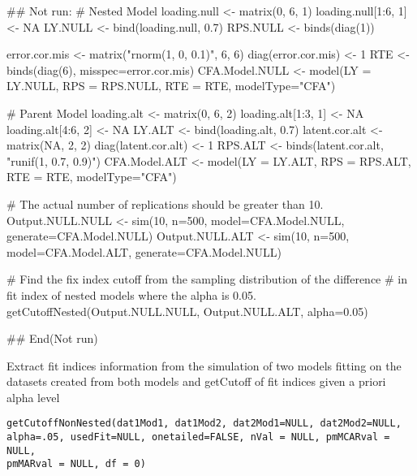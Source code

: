 \documentclass[a4paper]{book}
\begin{document}
\begin{Examples}
\begin{ExampleCode}
## Not run: 
# Nested Model
loading.null <- matrix(0, 6, 1)
loading.null[1:6, 1] <- NA
LY.NULL <- bind(loading.null, 0.7)
RPS.NULL <- binds(diag(1))

error.cor.mis <- matrix("rnorm(1, 0, 0.1)", 6, 6)
diag(error.cor.mis) <- 1
RTE <- binds(diag(6), misspec=error.cor.mis)
CFA.Model.NULL <- model(LY = LY.NULL, RPS = RPS.NULL, RTE = RTE, modelType="CFA")

# Parent Model
loading.alt <- matrix(0, 6, 2)
loading.alt[1:3, 1] <- NA
loading.alt[4:6, 2] <- NA
LY.ALT <- bind(loading.alt, 0.7)
latent.cor.alt <- matrix(NA, 2, 2)
diag(latent.cor.alt) <- 1
RPS.ALT <- binds(latent.cor.alt, "runif(1, 0.7, 0.9)")
CFA.Model.ALT <- model(LY = LY.ALT, RPS = RPS.ALT, RTE = RTE, modelType="CFA")

# The actual number of replications should be greater than 10.
Output.NULL.NULL <- sim(10, n=500, model=CFA.Model.NULL, generate=CFA.Model.NULL)
Output.NULL.ALT <- sim(10, n=500, model=CFA.Model.ALT, generate=CFA.Model.NULL)

# Find the fix index cutoff from the sampling distribution of the difference
# in fit index of nested models where the alpha is 0.05.
getCutoffNested(Output.NULL.NULL, Output.NULL.ALT, alpha=0.05)

## End(Not run)
\end{ExampleCode}
\end{Examples}
%
\begin{Description}\relax
Extract fit indices information from the simulation of two models fitting on the datasets created from both models and getCutoff of fit indices given a priori alpha level
\end{Description}
%
\begin{Usage}
\begin{verbatim}
getCutoffNonNested(dat1Mod1, dat1Mod2, dat2Mod1=NULL, dat2Mod2=NULL, 
alpha=.05, usedFit=NULL, onetailed=FALSE, nVal = NULL, pmMCARval = NULL, 
pmMARval = NULL, df = 0)
\end{verbatim}
\end{Usage}
%
\end{document}
